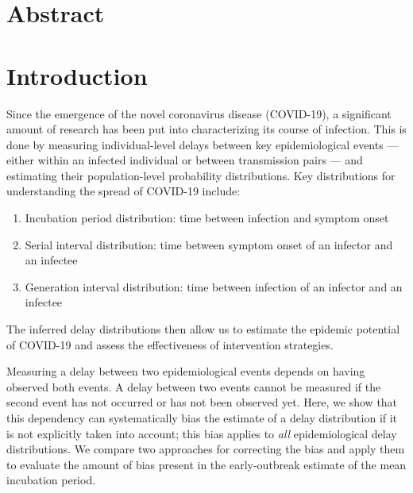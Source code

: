 \documentclass[12pt]{article}
\date{\today}
\begin{document}
\begin{flushleft}{
	\Large
	\textbf{}
}
\end{flushleft}

\section*{Abstract}

\pagebreak

\section{Introduction}

Since the emergence of the novel coronavirus disease (COVID-19), a significant amount of research has been put into characterizing its course of infection.
This is done by measuring individual-level delays between key epidemiological events --- either within an infected individual or between transmission pairs --- and estimating their population-level probability distributions.
Key distributions for understanding the spread of COVID-19 include:
\begin{enumerate}
  \item Incubation period distribution: time between infection and symptom onset \citep{backer2020incubation, li2020early, linton2020incubation, tian2020characteristics}
  \item Serial interval distribution: time between symptom onset of an infector and an infectee \citep{du2020serial, nishiura2020serial, zhao2020estimating, zhaotime}
  \item Generation interval distribution: time between infection of an infector and an infectee \citep{ganyani2020estimating}
\end{enumerate}
The inferred delay distributions then allow us to estimate the epidemic potential of COVID-19 and assess the effectiveness of intervention strategies.

Measuring a delay between two epidemiological events depends on having observed both events.
A delay between two events cannot be measured if the second event has not occurred or has not been observed yet.
Here, we show that this dependency can systematically bias the estimate of a delay distribution if it is not explicitly taken into account;
this bias applies to \emph{all} epidemiological delay distributions.
We compare two approaches for correcting the bias and apply them to evaluate the amount of bias present in the early-outbreak estimate of the mean incubation period.
\end{document}
